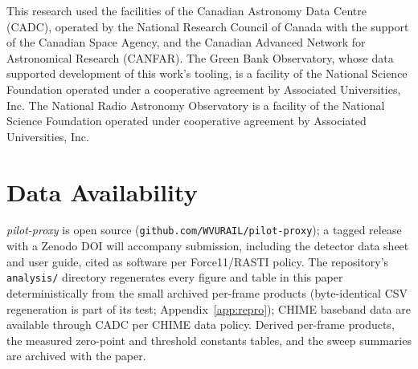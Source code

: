 This research used the facilities of the Canadian Astronomy Data Centre
(CADC), operated by the National Research Council of Canada with the
support of the Canadian Space Agency, and the Canadian Advanced Network
for Astronomical Research (CANFAR). The Green Bank Observatory, whose
data supported development of this work's tooling, is a facility of the
National Science Foundation operated under a cooperative agreement by
Associated Universities, Inc. The National Radio Astronomy Observatory
is a facility of the National Science Foundation operated under
cooperative agreement by Associated Universities, Inc.

\section*{Data Availability}
\label{sec:availability}

\textit{pilot-proxy} is open source
(\texttt{github.com/\allowbreak WVURAIL/\allowbreak pilot-proxy}); a tagged
release with a Zenodo DOI will accompany submission, including the detector
data sheet and user guide, cited as software per Force11/RASTI policy. The repository's
\texttt{analysis/} directory regenerates every figure and table in this
paper deterministically from the small archived per-frame products
(byte-identical CSV regeneration is part of its test;
Appendix~\ref{app:repro}); CHIME baseband data are available through CADC
per CHIME data policy. Derived per-frame products, the measured zero-point
and threshold constants tables, and the sweep summaries are archived with
the paper.
